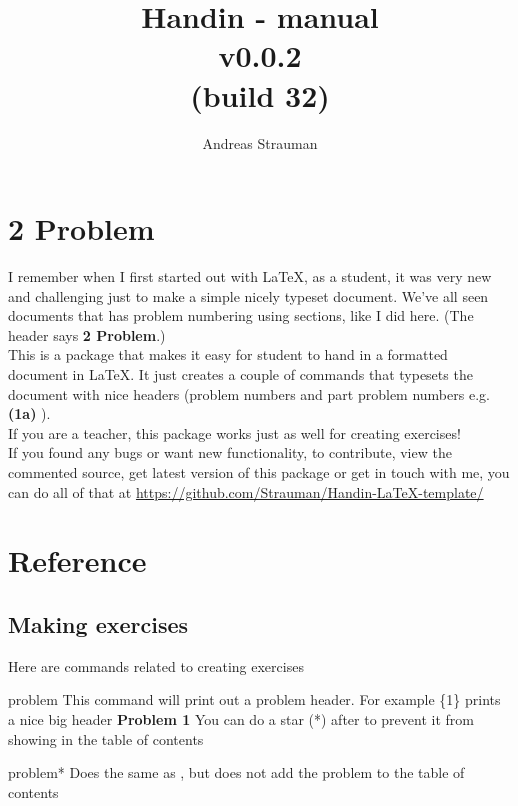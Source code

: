 \documentclass{article}
\title{{Handin - manual\\ v0.0.2{\\[-0.5em]\footnotesize(build 32)}}}
\author{Andreas Strauman}
\let\dac\docAuxCommand
\begin{document}
\maketitle
\section*{2 Problem}
I remember when I first started out with LaTeX, as a student, it was very new and challenging just to make a simple nicely typeset document. We've all seen documents that has problem numbering using sections, like I did here. (The header says \textbf{2 Problem}.)\\

This is a package that makes it easy for student to hand in a formatted document in LaTeX. It just creates a couple of commands that typesets the document with nice headers (problem numbers and part problem numbers e.g. \textbf{(1a)} ).\\

If you are a teacher, this package works just as well for creating exercises!\\
 
If you found any bugs or want new functionality, to contribute, view the commented source, get latest version of this package or get in touch with me, you can do all of that at \url{https://github.com/Strauman/Handin-LaTeX-template/}
\tableofcontents
\clearpage
 \section{Reference}
\subsection{Making exercises}
 Here are commands related to creating exercises


\begin{docCommand}[]{problem}{}
 This command will print out a problem header. For example \dac{problem}\{1\}
 prints a nice big header \textbf{Problem 1} You can do a star (*) after \dac{problem} to
 prevent it from showing in the table of contents

\end{docCommand}

\begin{docCommand}[]{problem*}{}
 Does the same as \dac{problem}, but does not add the problem to the table of contents

\end{docCommand}
\end{document}
